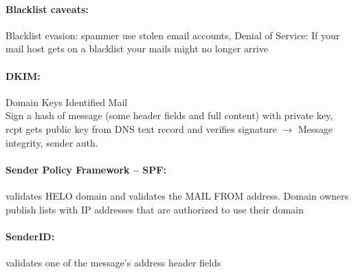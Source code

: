 \paragraph{Blacklist caveats:} Blacklist evasion: spammer use stolen email accounts, Denial of Service: If your mail host gets on a blacklist your mails might no longer arrive

\paragraph{DKIM:} Domain Keys Identified Mail \\
Sign a hash of message (some header fields and full content) with private key, rcpt gets public key from DNS text record and verifies signature $\to$ Message integrity, sender auth. 

\paragraph{Sender Policy Framework -- SPF:} validates HELO domain and validates the MAIL FROM address. Domain owners publish lists with IP addresses that are authorized to use their domain

\paragraph{SenderID:} validates one of the message's address header fields
